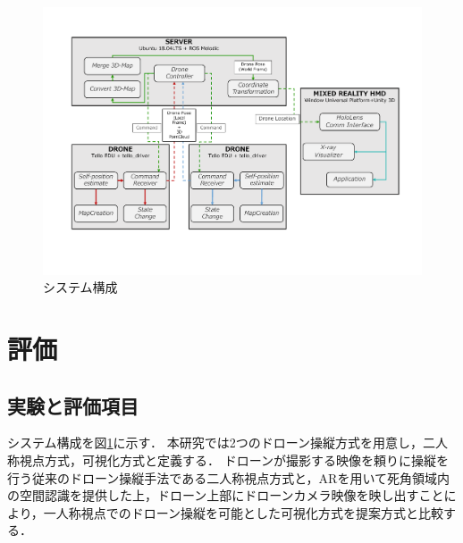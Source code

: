 \documentclass[a4paper,10pt,twocolumn,uplatex]{jsarticle}
\begin{document}


\begin{figure}[!tb]
  \centering
  \includegraphics[width=\linewidth]{img/system.pdf}
  \caption{システム構成}
  \label{fig:system}
\end{figure}
  

\section{評価}

\subsection{実験と評価項目}
システム構成を図\ref{fig:system}に示す．
本研究では2つのドローン操縦方式を用意し，二人称視点方式，可視化方式と定義する．
ドローンが撮影する映像を頼りに操縦を行う従来のドローン操縦手法である二人称視点方式と，ARを用いて死角領域内の空間認識を提供した上，ドローン上部にドローンカメラ映像を映し出すことにより，一人称視点でのドローン操縦を可能とした可視化方式を提案方式と比較する．
\end{document}
